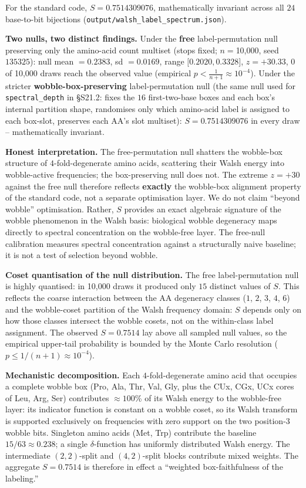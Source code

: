 \documentclass[preprint,11pt,authoryear,a4paper]{elsarticle}
\begin{document}
For the standard code, \(S = 0.7514309076\), mathematically invariant
across all \(24\) base-to-bit bijections
(\texttt{output/walsh\_label\_spectrum.json}).

\textbf{Two nulls, two distinct findings.} Under the \textbf{free}
label-permutation null preserving only the amino-acid count multiset
(stops fixed; \(n =\)10,000, seed \(135325\)): null mean \(= 0.2383\),
sd \(= 0.0169\), range \(\lbrack 0.2020,0.3328\rbrack\),
\(z = + 30.33\), \(0\) of 10,000 draws reach the observed value
(empirical \(p < \frac{1}{n + 1} \approx 10^{- 4}\)). Under the stricter
\textbf{wobble-box-preserving} label-permutation null (the same null
used for \texttt{spectral\_depth} in §S21.2: fixes the \(16\)
first-two-base boxes and each box's internal partition shape, randomises
only which amino-acid label is assigned to each box-slot, preserves each
AA's slot multiset): \(S = 0.7514309076\) in every draw --
mathematically invariant.

\textbf{Honest interpretation.} The free-permutation null shatters the
wobble-box structure of \(4\)-fold-degenerate amino acids, scattering
their Walsh energy into wobble-active frequencies; the box-preserving
null does not. The extreme \(z = + 30\) against the free null therefore
reflects \textbf{exactly} the wobble-box alignment property of the
standard code, not a separate optimisation layer. We do not claim
``beyond wobble'' optimisation. Rather, \(S\) provides an exact
algebraic signature of the wobble phenomenon in the Walsh basis:
biological wobble degeneracy maps directly to spectral concentration on
the wobble-free layer. The free-null calibration measures spectral
concentration against a structurally naive baseline; it is not a test of
selection beyond wobble.

\textbf{Coset quantisation of the null distribution.} The free
label-permutation null is highly quantised: in 10,000 draws it produced
only \(15\) distinct values of \(S\). This reflects the coarse
interaction between the AA degeneracy classes (\(1\), \(2\), \(3\),
\(4\), \(6\)) and the wobble-coset partition of the Walsh frequency
domain: \(S\) depends only on how those classes intersect the wobble
cosets, not on the within-class label assignment. The observed
\(S = 0.7514\) lay above all sampled null values, so the empirical
upper-tail probability is bounded by the Monte Carlo resolution
(\(p \leq 1/(n + 1) \approx 10^{- 4}\)).

\textbf{Mechanistic decomposition.} Each \(4\)-fold-degenerate amino
acid that occupies a complete wobble box (Pro, Ala, Thr, Val, Gly, plus
the CUx, CGx, UCx cores of Leu, Arg, Ser) contributes \(\approx 100\)\%
of its Walsh energy to the wobble-free layer: its indicator function is
constant on a wobble coset, so its Walsh transform is supported
exclusively on frequencies with zero support on the two position-3
wobble bits. Singleton amino acids (Met, Trp) contribute the baseline
\(15/63 \approx 0.238\); a single \(\delta\)-function has uniformly
distributed Walsh energy. The intermediate \((2,2)\)-split and
\((4,2)\)-split blocks contribute mixed weights. The aggregate
\(S = 0.7514\) is therefore in effect a ``weighted box-faithfulness of
the labeling.''
\end{document}
